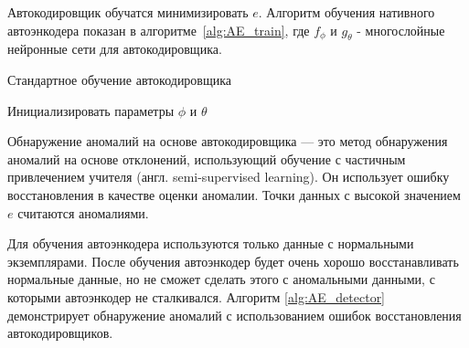 Автокодировщик обучатся минимизировать $e$. Алгоритм обучения нативного автоэнкодера показан в алгоритме~\ref{alg:AE_train}, где $f_{\phi}$ и $g_{\theta}$ - многослойные нейронные сети для автокодировщика.

\begin{algorithm}[htp!]
    \caption{Стандартное обучение автокодировщика} \label{alg:AE_train}
    \SetAlgoLined %
    
    Инициализировать параметры $\phi$ и $\theta$ \\
\end{algorithm}

Обнаружение аномалий на основе автокодировщика --- это метод обнаружения аномалий на основе отклонений, использующий обучение с частичным привлечением учителя (англ. semi-supervised learning). Он использует ошибку восстановления в качестве оценки аномалии. Точки данных с высокой значением $e$ считаются аномалиями. 

Для обучения автоэнкодера используются только данные с нормальными экземплярами. После обучения автоэнкодер будет очень хорошо восстанавливать нормальные данные, но не сможет сделать этого с аномальными данными, с которыми автоэнкодер не сталкивался. Алгоритм \ref{alg:AE_detector} демонстрирует обнаружение аномалий с использованием ошибок восстановления автокодировщиков.

\newpage

